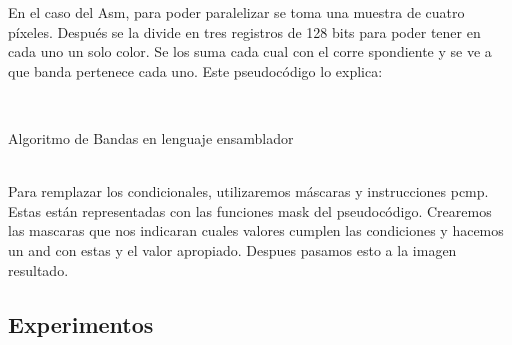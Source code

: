 ﻿\documentclass[a4paper]{article}
\begin{document}
En el caso del Asm, para poder paralelizar se toma una muestra de cuatro píxeles. Después se la divide en tres registros de 128 bits para poder tener en cada uno un solo color. Se los suma cada cual con el corre
spondiente y se ve a que banda pertenece cada uno.
Este pseudocódigo lo explica:
\ \\
\begin{algorithm}[H]
\ \\


\caption{Algoritmo de Bandas en lenguaje ensamblador}
\end{algorithm}	
\ \\
Para remplazar los condicionales, utilizaremos máscaras y instrucciones pcmp. Estas están representadas con las funciones mask del pseudocódigo. Crearemos las mascaras que nos indicaran cuales valores cumplen las condiciones y hacemos un and con estas y el valor apropiado. Despues pasamos esto a la imagen resultado. 

\subsection{Experimentos}
\end{document}
